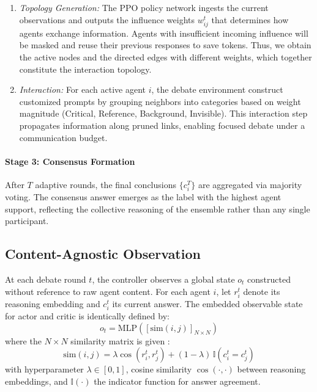 \begin{enumerate}
\item \emph{Topology Generation:} The PPO policy network ingests the current observations and outputs the influence weights $w_{ij}^t$ that determines how agents exchange information. Agents with insufficient incoming influence will be masked and reuse their previous responses to save tokens. Thus, we obtain the active nodes and the directed edges with different weights, which together constitute the interaction topology.
\item \emph{Interaction:} For each active agent $i$, the debate environment construct customized prompts by grouping neighbors into categories based on weight magnitude (Critical, Reference, Background, Invisible). This interaction step propagates information along pruned links, enabling focused debate under a communication budget.
\end{enumerate}

\paragraph{\textbf{Stage 3: Consensus Formation}}
After $T$ adaptive rounds, the final conclusions $\{c_i^T\}$ are aggregated via majority voting. The consensus answer emerges as the label with the highest agent support, reflecting the collective reasoning of the ensemble rather than any single participant.


\subsection{Content-Agnostic Observation}

At each debate round $t$, the controller observes a global state $o_t$ constructed without reference to raw agent content. For each agent $i$, let $r_i^t$ denote its reasoning embedding and $c_i^t$ its current answer. The embedded observable state for actor and critic is identically defined by:
\begin{equation}
o_t = \mathrm{MLP}(\left[ \mathrm{sim}(i,j)\right]_{N\times N})
\end{equation}
where the $N\times N$ similarity matrix is given :
\begin{equation}
\mathrm{sim}(i, j) = \lambda \cos(r_i^t, r_j^t) + (1-\lambda)\, \mathbb{I}(c_i^t = c_j^t)
\label{eq:similarity}
\end{equation}
with hyperparameter $\lambda \in [0,1]$, cosine similarity $\cos(\cdot, \cdot)$ between reasoning embeddings, and $\mathbb{I}(\cdot)$ the indicator function for answer agreement. 

